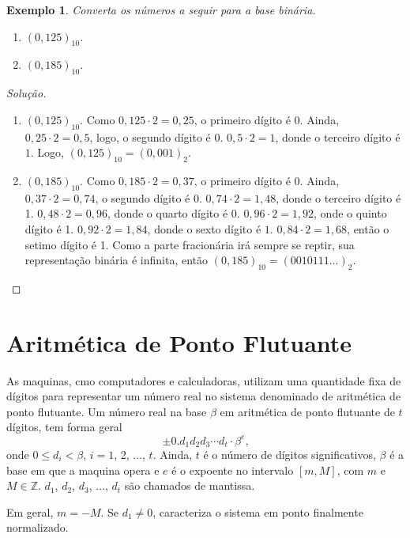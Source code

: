 \documentclass[
	12pt,				%
	openright,			%
	twoside,			%
	a4paper,			%
	english,			%
	french,				%
	brazil,				%
	sumario=tradicional
]{abntex2}
\newtheorem{example}{Exemplo}
\newenvironment{solution}{
	\begin{proof}[Solução]
}{\end{proof}}
\numberwithin{example}{chapter}
\numberwithin{remark}{chapter}
\numberwithin{definition}{chapter}
\numberwithin{figure}{chapter}
\begin{document}
\begin{example}
    Converta os números a seguir para a base binária.
    \begin{enumerate}
        \item $(0,125)_{10}$.
        \item $(0,185)_{10}$.
    \end{enumerate}
\end{example}
\begin{solution}\hfill
	\begin{enumerate}
        \item $(0,125)_{10}$. Como $0,125\cdot 2 = 0,25$, o primeiro dígito é 0. Ainda, $0,25\cdot 2=0,5$, logo, o segundo dígito é 0. $0,5\cdot 2=1$, donde o terceiro dígito é $1$. Logo, $(0,125)_{10}=(0,001)_{2}$.
        
        \item $(0,185)_{10}$. Como $0,185\cdot 2=0,37$, o primeiro dígito é 0. Ainda, $0,37\cdot 2=0,74$, o segundo dígito é 0. $0,74\cdot 2=1,48$, donde o terceiro dígito é 1. $0,48\cdot 2=0,96$, donde o quarto dígito é 0. $0,96\cdot 2=1,92$, onde o quinto dígito é 1. $0,92\cdot 2=1,84$, donde o sexto dígito é $1$. $0,84\cdot 2=1,68$, então o setimo dígito é 1. Como a parte fracionária irá sempre se reptir, sua representação binária é infinita, então $(0,185)_{10}=(0010111\dots)_{2}$.
    \end{enumerate}
\end{solution}

\section{Aritmética de Ponto Flutuante}

As maquinas, cmo computadores e calculadoras, utilizam uma quantidade fixa de dígitos para representar um número real no sistema denominado de aritmética de ponto flutuante. Um número real na base $\beta$ em aritmética de ponto flutuante de $t$ dígitos, tem forma geral
$$
    \pm
    0.d_{1}d_{2}d_{3}\cdots d_{t}\cdot \beta ^{e}
    \text{,}
$$
onde $0 \leqslant d_i < \beta$, $i=1$, 2, $\dots$, $t$. Ainda, $t$ é o número de dígitos significativos, $\beta$ é a base em que a maquina opera e $e$ é o expoente no intervalo $[m, M]$, com $m$ e $M \in \mathbb{Z}$. $d_1$, $d_2$, $d_3$, $\dots$, $d_t$ são chamados de mantissa.

Em geral, $m=-M$. Se $d_1\neq 0$, caracteriza o sistema em ponto finalmente normalizado.
\end{document}
